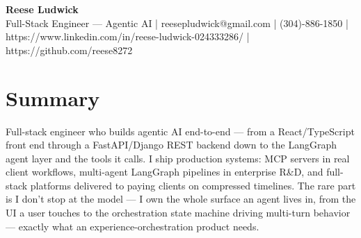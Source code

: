 \documentclass[10pt]{article}
\begin{document}
\begin{center}
{\fontsize{14}{16}\selectfont\bfseries Reese Ludwick}\\[1pt]
{\fontsize{9}{11}\selectfont Full-Stack Engineer — Agentic AI | reesepludwick@gmail.com | (304)-886-1850 | https://www.linkedin.com/in/reese-ludwick-024333286/ | https://github.com/reese8272}
\end{center}
\vspace{-2pt}
\section*{Summary}
\noindent Full-stack engineer who builds agentic AI end-to-end — from a React/TypeScript front end through a FastAPI/Django REST backend down to the LangGraph agent layer and the tools it calls. I ship production systems: MCP servers in real client workflows, multi-agent LangGraph pipelines in enterprise R\&D, and full-stack platforms delivered to paying clients on compressed timelines. The rare part is I don't stop at the model — I own the whole surface an agent lives in, from the UI a user touches to the orchestration state machine driving multi-turn behavior — exactly what an experience-orchestration product needs.\par
\end{document}
